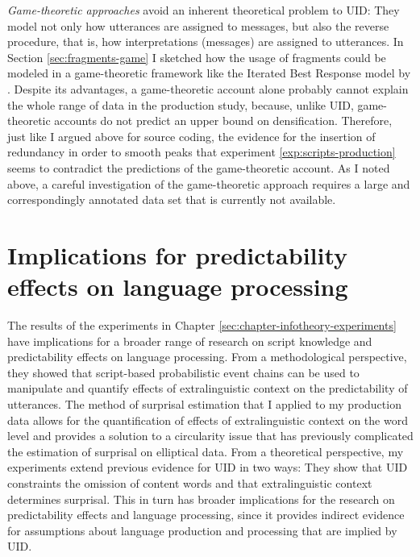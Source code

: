 \textit{Game-theoretic approaches} avoid an inherent theoretical problem to UID: They model not only how utterances are assigned to messages, but also the reverse procedure, that is, how interpretations (messages) are assigned to utterances. In Section \ref{sec:fragments-game} I sketched how the usage of fragments could be modeled in a game-theoretic framework like the Iterated Best Response model by \citet{franke2009}. Despite its advantages, a game-theoretic account alone probably cannot explain the whole range of data in the production study, because, unlike UID, game-theoretic accounts do not predict an upper bound on densification. Therefore, just like I argued above for source coding, the evidence for the insertion of redundancy in order to smooth peaks that experiment \ref{exp:scripts-production} seems to contradict the predictions of the game-theoretic account. As I noted above, a careful investigation of the game-theoretic approach requires a large and correspondingly annotated data set that is currently not available.

\section{Implications for predictability effects on language processing}
The results of the experiments in Chapter \ref{sec:chapter-infotheory-experiments} have implications for a broader range of research on script knowledge and predictability effects on language processing. From a methodological perspective, they showed that script-based probabilistic event chains can be used to manipulate and quantify effects of extralinguistic context on the predictability of utterances. The method of surprisal estimation that I applied to my production data allows for the quantification of effects of extralinguistic context on the word level and provides a solution to a circularity issue that has previously complicated the estimation of surprisal on elliptical data. From a theoretical perspective, my experiments extend previous evidence for UID in two ways: They show that UID constraints the omission of content words and that extralinguistic context determines surprisal. This in turn has broader implications for the research on predictability effects and language processing, since it provides indirect evidence for assumptions about language production and processing that are implied by UID.

